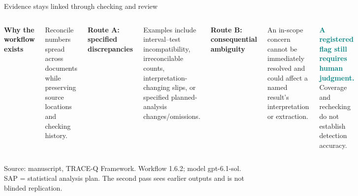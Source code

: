 \documentclass[10pt,aspectratio=169]{beamer}
\newcommand{\src}[1]{\par\vfill{\color{Slate}\fontsize{6.5}{8}\selectfont #1\par}}
\begin{document}
\begin{frame}[t]{Evidence stays linked through checking and review}
\begin{columns}[T,onlytextwidth]
\centering
{}
\small
\textbf{Why the workflow exists}\par
Reconcile numbers spread across documents while preserving source locations and checking history.
\medskip\par
\textbf{Route A: specified discrepancies}\par
Examples include interval--test incompatibility, irreconcilable counts, interpretation-changing slips, or specified planned-analysis changes/omissions.
\medskip\par
\textbf{Route B: consequential ambiguity}\par
An in-scope concern cannot be immediately resolved and could affect a named result's interpretation or extraction.
\medskip\par
\textcolor{Teal}{\textbf{A registered flag still requires human judgment.}} Coverage and rechecking do not establish detection accuracy.
\end{columns}
\src{Source: manuscript, TRACE-Q Framework. Workflow 1.6.2; model gpt-6.1-sol. SAP = statistical analysis plan. The second pass sees earlier outputs and is not blinded replication.}
\end{frame}
\end{document}
